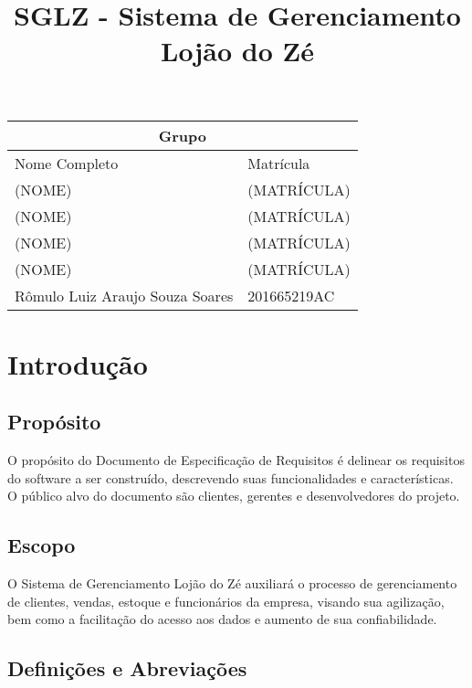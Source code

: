 \documentclass[notitlepage, draft]{article}
\title{\textbf{SGLZ} - Sistema de Gerenciamento Lojão do Zé}
\begin{document}
    \date{}
    \maketitle

\vspace{15cm}

\begin{tabular}{|p{10.5 cm}|p{4.5 cm}|}
    \hline
    \multicolumn{2}{|c|}{Grupo} \\
    \hline
    Nome Completo & Matrícula \\
    \hline
    (NOME)  & (MATRÍCULA) \\
    (NOME)  & (MATRÍCULA) \\
    (NOME)  & (MATRÍCULA) \\
    (NOME)  & (MATRÍCULA) \\
    Rômulo Luiz Araujo Souza Soares  & 201665219AC \\
    \hline
\end{tabular}
    
    
    \newpage
    
    
    \tableofcontents
    


    
    \newpage %
    
    \section{Introdução}
        \subsection{Propósito}
    O propósito do Documento de Especificação de Requisitos é delinear os requisitos do software a ser construído, descrevendo suas funcionalidades e características. O público alvo do documento são clientes, gerentes e desenvolvedores do projeto.
    
        \subsection{Escopo}
    O Sistema de Gerenciamento Lojão do Zé auxiliará o processo de gerenciamento de clientes, vendas, estoque e funcionários da empresa, visando sua agilização, bem como a facilitação do acesso aos dados e aumento de sua confiabilidade.
    
        \subsection{Definições e Abreviações}
        
\end{document}
